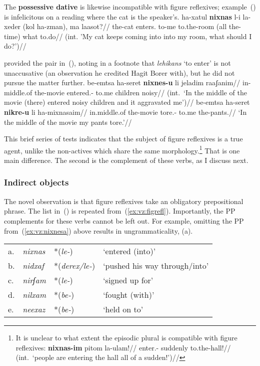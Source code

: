 The \textbf{possessive dative} is likewise incompatible with figure reflexives; example~(\nextx) is infelicitous on a reading where the cat is the speaker's.
\ex \begingl
	\gla\ljudge{\#}ha-xatul \textbf{nixnas} l-i la-xeder (kol ha-zman), ma laasot?//
	\glb the-cat enters. to-me to.the-room (all the-time) what to.do//
	\glft (int. 'My cat keeps coming into into my room, what should I do?')//
	\endgl
\xe

\citet[134]{shlonsky87} provided the pair in~(\nextx), noting in a footnote that \emph{lehikans} `to enter' is not unaccusative (an observation he credited Hagit Borer with), but he did not pursue the matter further.
\pex
	\a \ljudge{*} \begingl
		\gla be-emtsa ha-seret \textbf{nixnes-u} li jeladim raaʃanim//
		\glb in-middle.of the-movie entered.- to.me children noisy//
		\glft (int.~`In the middle of the movie (there) entered noisy children and it aggravated me')//
		\endgl
	\a \begingl
		\gla be-emtsa ha-seret \textbf{nikre-u} li ha-mixnasaim//
		\glb in.middle.of the-movie tore.- to.me the-pants.//
		\glft `In the middle of the movie my pants tore.'//
		\endgl
\xe

This brief series of tests indicates that the subject of figure reflexives is a true agent, unlike the non-actives which share the same morphology.\footnote{It is unclear to what extent the episodic plural is compatible with figure reflexives:
\ex {} \begingl
	\gla \textbf{nixnas-im} pitom la-ulam!//
	\glb enter.- suddenly to.the-hall!//
	\glft (int.~`people are entering the hall all of a sudden!')//
	\endgl
\xe}
That is one main difference. The second is the complement of these verbs, as I discuss next.

	\subsubsection{Indirect objects} \label{vz:tnif:figrefl:pp}
The novel observation is that figure reflexives take an obligatory prepositional phrase. The list in~(\nextx) is repeated from~(\ref{ex:vz:figrefl}). Importantly, the PP complements for these verbs cannot be left out. For example, omitting the PP from~(\ref{ex:vz:nixnesa}) above results in ungrammaticality, (\anextx a).
\ex \begin{tabular}{l>{\em}lll}
	a.& nixnas &  *(\emph{le-}) & `entered (into)'\\
	b.& nidxaf & *(\emph{derex/le-})  & `pushed his way through/into' \\
	c.& nirʃam & *(\emph{le-})  & `signed up for' \\
	d.& nilxam & *(\emph{be-}) & `fought (with)' \\
	e.& neexaz & *(\emph{be-}) & `held on to' \\
    \end{tabular}
\xe


